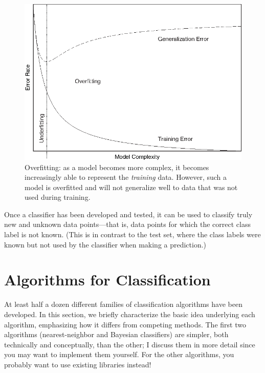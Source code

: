 \begin{figure}
\centerline{\includegraphics{img/overfitting}}
  \caption{Overfitting: as a model becomes more complex, it becomes
    increasingly able to represent the \emph{training} data. However,
    such a model is overfitted and will not generalize well to data
    that was not used during training.}
  \label{fig:overfitting}%
\end{figure}

Once a classifier has been developed and tested, it can be used to
classify truly new and unknown data points---that is, data points for
which the correct class label is not known. (This is in contrast to
the test set, where the class labels were known but not used by the
classifier when making a prediction.)\vspace*{-4pt}


\section{Algorithms for Classification}

  
At least half a dozen different families of classification algorithms
have been developed. In this section, we briefly characterize the
basic idea underlying each algorithm, emphasizing how it differs from
competing methods. The first two algorithms (nearest-neighbor and
Bayesian classifiers) are simpler, both technically and conceptually,
than\vadjust{\pagebreak} the other; I discuss them in more detail since you may want to
implement them yourself. For the other algorithms, you probably want
to use existing libraries instead!


